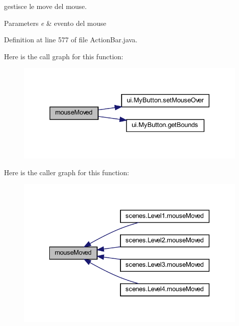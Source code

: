 gestisce le move del mouse. 


\begin{DoxyParams}{Parameters}
{\em e} & evento del mouse \\
\hline
\end{DoxyParams}


Definition at line 577 of file Action\+Bar.\+java.

Here is the call graph for this function\+:\nopagebreak
\begin{figure}[H]
\begin{center}
\leavevmode
\includegraphics[width=324pt]{classui_1_1_action_bar_a2ca251710b65639ec80bc141edde60aa_cgraph}
\end{center}
\end{figure}
Here is the caller graph for this function\+:\nopagebreak
\begin{figure}[H]
\begin{center}
\leavevmode
\includegraphics[width=328pt]{classui_1_1_action_bar_a2ca251710b65639ec80bc141edde60aa_icgraph}
\end{center}
\end{figure}
\mbox{\label{classui_1_1_action_bar_aed82e1ce3dd3cf283d508c3ba3be70ef}} 
